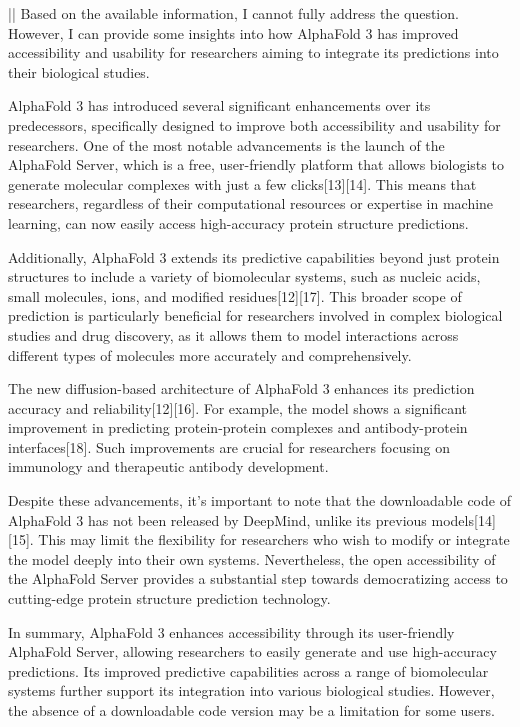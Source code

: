 \begin{showcase}[title=Topic: AlphaFold 3]
||
Based on the available information, I cannot fully address the question. However, I can provide some insights into how AlphaFold 3 has improved accessibility and usability for researchers aiming to integrate its predictions into their biological studies.

AlphaFold 3 has introduced several significant enhancements over its predecessors, specifically designed to improve both accessibility and usability for researchers. One of the most notable advancements is the launch of the AlphaFold Server, which is a free, user-friendly platform that allows biologists to generate molecular complexes with just a few clicks[13][14]. This means that researchers, regardless of their computational resources or expertise in machine learning, can now easily access high-accuracy protein structure predictions. 

Additionally, AlphaFold 3 extends its predictive capabilities beyond just protein structures to include a variety of biomolecular systems, such as nucleic acids, small molecules, ions, and modified residues[12][17]. This broader scope of prediction is particularly beneficial for researchers involved in complex biological studies and drug discovery, as it allows them to model interactions across different types of molecules more accurately and comprehensively.

The new diffusion-based architecture of AlphaFold 3 enhances its prediction accuracy and reliability[12][16]. For example, the model shows a significant improvement in predicting protein-protein complexes and antibody-protein interfaces[18]. Such improvements are crucial for researchers focusing on immunology and therapeutic antibody development.

Despite these advancements, it's important to note that the downloadable code of AlphaFold 3 has not been released by DeepMind, unlike its previous models[14][15]. This may limit the flexibility for researchers who wish to modify or integrate the model deeply into their own systems. Nevertheless, the open accessibility of the AlphaFold Server provides a substantial step towards democratizing access to cutting-edge protein structure prediction technology.

In summary, AlphaFold 3 enhances accessibility through its user-friendly AlphaFold Server, allowing researchers to easily generate and use high-accuracy predictions. Its improved predictive capabilities across a range of biomolecular systems further support its integration into various biological studies. However, the absence of a downloadable code version may be a limitation for some users.


\end{showcase}
